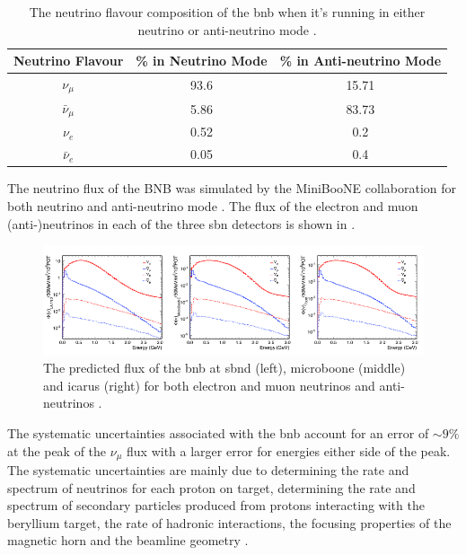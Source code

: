 \begin{table}[h]
\begin{tabular}{ccc}
Neutrino Flavour & \% in Neutrino Mode & \% in Anti-neutrino Mode \\ \hline
$\nu_\mu$        & 93.6                & 15.71                    \\
$\bar{\nu}_{\mu}$  & 5.86                & 83.73                    \\
$\nu_e$          & 0.52                & 0.2                      \\
$\bar{\nu}_{e}$    & 0.05                & 0.4                     
\end{tabular}
\caption[BNB flavour composition.]{The neutrino flavour composition of the \gls{bnb} when it's running in either neutrino or anti-neutrino mode \cite{BNB_flux}.}
\label{Table: BNB composition}
\end{table}

 The neutrino flux of the BNB was simulated by the MiniBooNE collaboration for both neutrino and anti-neutrino mode \cite{BNB_flux}. The flux of the electron and muon (anti-)neutrinos in each of the three \gls{sbn} detectors is shown in .
 \begin{figure}[h!]
     \centering
     \includegraphics[width = \largefigwidth]{figures-chap3/SBN_flux.png}
     \caption[Neutrino fluxes in SBN.]{The predicted flux of the \gls{bnb} at \gls{sbnd} (left), \gls{microboone} (middle) and \gls{icarus} (right) for both electron and muon neutrinos and anti-neutrinos \cite{SBN_Proposal}.}
     \label{fig: SBN flux}
\end{figure}
The systematic uncertainties associated with the \gls{bnb} account for an error of $\sim 9\%$ at the peak of the $\nu_\mu$ flux with a larger error for energies either side of the peak. The systematic uncertainties are mainly due to determining the rate and spectrum of neutrinos for each proton on target, determining the rate and spectrum of secondary particles produced from protons interacting with the beryllium target, the rate of hadronic interactions, the focusing properties of the magnetic horn and the beamline geometry \cite{BNB_flux}. 

